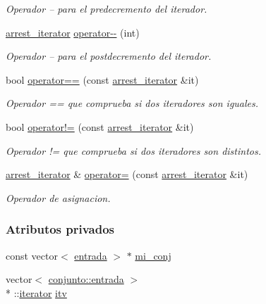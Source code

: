 \begin{DoxyCompactItemize}
\begin{DoxyCompactList}\small\item\em Operador -- para el predecremento del iterador. \end{DoxyCompactList}\item 
\hyperlink{classconjunto_1_1arrest__iterator}{arrest\-\_\-iterator} \hyperlink{classconjunto_1_1arrest__iterator_a3c186a9a4e6ef773247f8354ee2d982f}{operator-\/-\/} (int)
\begin{DoxyCompactList}\small\item\em Operador -- para el postdecremento del iterador. \end{DoxyCompactList}\item 
bool \hyperlink{classconjunto_1_1arrest__iterator_aade6dffd9f9567f028924df6b3bb6df4}{operator==} (const \hyperlink{classconjunto_1_1arrest__iterator}{arrest\-\_\-iterator} \&it)
\begin{DoxyCompactList}\small\item\em Operador == que comprueba si dos iteradores son iguales. \end{DoxyCompactList}\item 
bool \hyperlink{classconjunto_1_1arrest__iterator_a5d0132bc8c7b409b1dced9de2a5ab895}{operator!=} (const \hyperlink{classconjunto_1_1arrest__iterator}{arrest\-\_\-iterator} \&it)
\begin{DoxyCompactList}\small\item\em Operador != que comprueba si dos iteradores son distintos. \end{DoxyCompactList}\item 
\hyperlink{classconjunto_1_1arrest__iterator}{arrest\-\_\-iterator} \& \hyperlink{classconjunto_1_1arrest__iterator_a730f334e632cc751eebc2c5b6532c248}{operator=} (const \hyperlink{classconjunto_1_1arrest__iterator}{arrest\-\_\-iterator} \&it)
\begin{DoxyCompactList}\small\item\em Operador de asignacion. \end{DoxyCompactList}\end{DoxyCompactItemize}
\subsubsection*{Atributos privados}
\begin{DoxyCompactItemize}
\item 
const vector$<$ \hyperlink{classconjunto_a09cad766dd65de73e51eae21f9d22585}{entrada} $>$ $\ast$ \hyperlink{classconjunto_1_1arrest__iterator_a380864585c393179b6b33e89b0f30da0}{mi\-\_\-conj}
\item 
vector$<$ \hyperlink{classconjunto_a09cad766dd65de73e51eae21f9d22585}{conjunto\-::entrada} $>$\\*
\-::\hyperlink{classconjunto_1_1iterator}{iterator} \hyperlink{classconjunto_1_1arrest__iterator_ad5f1edd37d042374db6a137ec8de3535}{itv}
\end{DoxyCompactItemize}

